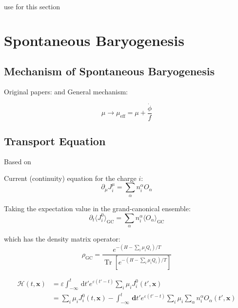 \documentclass[master,       %
               twoside,        %
               BCOR10mm,       %
               english,ngerman, %
               ]{GAUBM}
\begin{document}
\begin{otherlanguage}{english}
use \cite{Di_Luzio_2020_Landscape_of_QCD_Axion_models}
for this section


\chapter{Spontaneous Baryogenesis}

\section{Mechanism of Spontaneous Baryogenesis}

Original papers: \cite{COHEN1987251} and \cite{COHEN1988913}
General mechanism: \cite{Domcke:2020kcp_Generic_Couplings}

\begin{equation}
	\mu \to \mu_\mathrm{eff} = \mu + \frac{\dot{\phi}}{f}
\end{equation}

\section{Transport Equation}

Based on \cite{Domcke:2020kcp_Generic_Couplings}

Current (continuity) equation for the charge $i$:
\begin{equation}
	\partial_\mu J_i^\mu = \sum_\alpha n_i^\alpha O_\alpha
\end{equation}

Taking the expectation value in the grand-canonical ensemble:
\begin{equation}
	\partial_t \langle J_i^0 \rangle_{\mathrm{GC}} = \sum_\alpha n_i^\alpha \langle O_\alpha \rangle_{\mathrm{GC}}
\end{equation}

which has the density matrix operator:
\begin{equation}
	\rho_\mathrm{GC} = \frac{e^{- (H - \sum_i \mu_i Q_i) / T}}{\operatorname{Tr} \left[ e^{- (H - \sum_i \mu_i Q_i) / T} \right] }
\end{equation}

\begin{align}
	\mathcal{H}(t, \mathbf{x}) &= \varepsilon \int_{- \infty}^t \, \mathrm{d} t' e^{\varepsilon (t' - t)} \sum_i \mu_i J_i^0(t', \mathbf{x}) \nonumber \\
	&= \sum_i \mu_i J_i^0(t, \mathbf{x}) - \int_{- \infty}^t \, \mathbf{d} t' e^{\varepsilon (t' - t)} \sum_i \mu_i \sum_\alpha n_i^\alpha O_\alpha(t' , \mathbf{x})
\end{align}


\end{otherlanguage}
\end{document}
